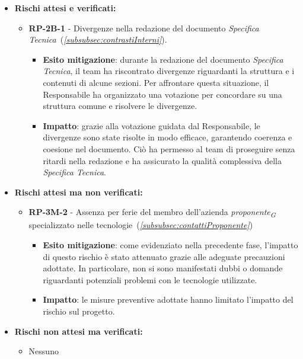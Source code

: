 \begin{itemize}
    \item \textbf{Rischi attesi e verificati:}
        \begin{itemize}
            \item \textbf{RP-2B-1} - Divergenze nella redazione del documento \textit{Specifica Tecnica}~(\textit{\ref{subsubsec:contrastiInterni}}).
            \begin{itemize}
                \item \textbf{Esito mitigazione}: durante la redazione del documento \textit{Specifica Tecnica}, il team ha riscontrato divergenze riguardanti la struttura e i contenuti di alcune sezioni. Per affrontare questa situazione, il Responsabile ha organizzato una votazione per concordare su una struttura comune e risolvere le divergenze.
                \item \textbf{Impatto}: grazie alla votazione guidata dal Responsabile, le divergenze sono state risolte in modo efficace, garantendo coerenza e coesione nel documento. Ciò ha permesso al team di proseguire senza ritardi nella redazione e ha assicurato la qualità complessiva della \textit{Specifica Tecnica}.
            \end{itemize}
            
        \end{itemize}
    \item \textbf{Rischi attesi ma non verificati:}
        \begin{itemize}
            \item \textbf{RP-3M-2} - Assenza per ferie del membro dell'azienda \textit{proponente}\textsubscript{\textit{G}} specializzato nelle tecnologie~(\textit{\ref{subsubsec:contattiProponente}})
                \begin{itemize}
                    \item \textbf{Esito mitigazione}: come evidenziato nella precedente fase, l'impatto di questo rischio è stato attenuato grazie alle adeguate precauzioni adottate. In particolare, non si sono manifestati dubbi o domande riguardanti potenziali problemi con le tecnologie utilizzate.
                    \item \textbf{Impatto}: 
                    le misure preventive adottate hanno limitato l'impatto del rischio sul progetto.
                \end{itemize}
        \end{itemize}
    \item \textbf{Rischi non attesi ma verificati:}
        \begin{itemize}
            \item Nessuno
        \end{itemize}
\end{itemize}


